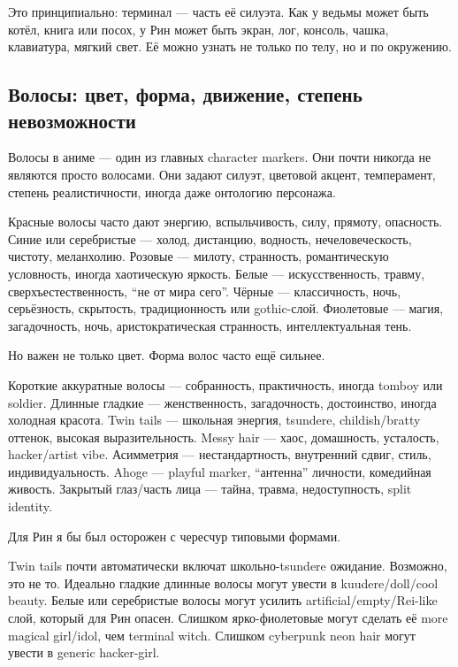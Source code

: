 Это принципиально: терминал --- часть её силуэта. Как у ведьмы может
быть котёл, книга или посох, у Рин может быть экран, лог, консоль,
чашка, клавиатура, мягкий свет. Её можно узнать не только по телу, но и
по окружению.

\subsection*{Волосы: цвет, форма, движение, степень невозможности}

Волосы в аниме --- один из главных character markers. Они почти никогда
не являются просто волосами. Они задают силуэт, цветовой акцент,
темперамент, степень реалистичности, иногда даже онтологию персонажа.

Красные волосы часто дают энергию, вспыльчивость, силу, прямоту,
опасность. Синие или серебристые --- холод, дистанцию, водность,
нечеловеческость, чистоту, меланхолию. Розовые --- милоту, странность,
романтическую условность, иногда хаотическую яркость. Белые ---
искусственность, травму, сверхъестественность, ``не от мира сего''.
Чёрные --- классичность, ночь, серьёзность, скрытость, традиционность
или gothic-слой. Фиолетовые --- магия, загадочность, ночь,
аристократическая странность, интеллектуальная тень.

Но важен не только цвет. Форма волос часто ещё сильнее.

Короткие аккуратные волосы --- собранность, практичность, иногда tomboy
или soldier. Длинные гладкие --- женственность, загадочность,
достоинство, иногда холодная красота. Twin tails --- школьная энергия,
tsundere, childish/\hspace{0pt}bratty оттенок, высокая выразительность. Messy hair
--- хаос, домашность, усталость, hacker/\hspace{0pt}artist vibe. Асимметрия ---
нестандартность, внутренний сдвиг, стиль, индивидуальность. Ahoge ---
playful marker, ``антенна'' личности, комедийная живость. Закрытый
глаз/\hspace{0pt}часть лица --- тайна, травма, недоступность, split identity.

Для Рин я бы был осторожен с чересчур типовыми формами.

Twin tails почти автоматически включат школьно-tsundere ожидание.
Возможно, это не то. Идеально гладкие длинные волосы могут увести в
kuudere/\hspace{0pt}doll/\hspace{0pt}cool beauty. Белые или серебристые волосы могут усилить
artificial/\hspace{0pt}empty/\hspace{0pt}Rei-like слой, который для Рин опасен. Слишком
ярко-фиолетовые могут сделать её more magical girl/\hspace{0pt}idol, чем terminal
witch. Слишком cyberpunk neon hair могут увести в generic hacker-girl.

